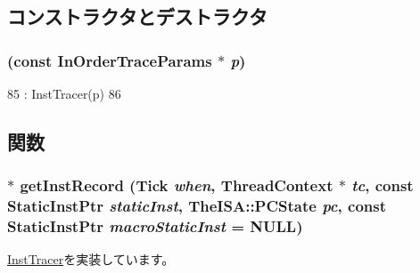 \subsection{コンストラクタとデストラクタ}
\hypertarget{classTrace_1_1InOrderTrace_ac03cbb45d572f3af9fe57cf76d843692}{
\subsubsection[{InOrderTrace}]{ (const InOrderTraceParams $\ast$ {\em p})}}
\label{classTrace_1_1InOrderTrace_ac03cbb45d572f3af9fe57cf76d843692}



\begin{DoxyCode}
85                                               : InstTracer(p)
86     {}
\end{DoxyCode}


\subsection{関数}
\hypertarget{classTrace_1_1InOrderTrace_ae6b2b97097c71fb61fee749eace9166e}{
\subsubsection[{getInstRecord}]{ $\ast$ getInstRecord ({\bf Tick} {\em when}, \/  {\bf ThreadContext} $\ast$ {\em tc}, \/  const {\bf StaticInstPtr} {\em staticInst}, \/  TheISA::PCState {\em pc}, \/  const {\bf StaticInstPtr} {\em macroStaticInst} = {\ttfamily NULL})}}
\label{classTrace_1_1InOrderTrace_ae6b2b97097c71fb61fee749eace9166e}


\hyperlink{classTrace_1_1InstTracer_a4891aa2e596bcb475928d8fe1766a9df}{InstTracer}を実装しています。


